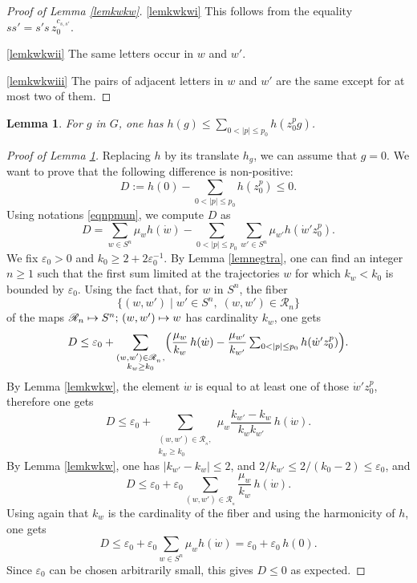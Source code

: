 \documentclass[JEP,XML,SOM,Unicode]{cedram}
\let\mathcal\mathscr
\def\mto{\mathchoice{\longmapsto}{\mapsto}{\mapsto}{\mapsto}}
\newtheorem{Lem}[Thm]{Lemma}
\theoremstyle{definition}
\newcommand{\mc}[1]{\mathcal{ #1}}
\let\eps\varepsilon
\begin{document}
\skpt
\begin{proof}[Proof of Lemma \ref{lemkwkw}]
\eqref{lemkwkwi} This follows from the equality $ss'=s's\, z_0^{c_{s,s'}}$.

\eqref{lemkwkwii} The same letters occur in $w$ and $w'$.

\eqref{lemkwkwiii} The pairs of adjacent letters in $w$ and $w'$ are the same except for at most two of them.
\end{proof}

\begin{Lem}
\label{lemhghgzp}
For $g$ in $G$, one has $h(g)\leq \sum_{0<|p|\leq p_0}h(z_0^pg)$.
\end{Lem}

\begin{proof}[Proof of Lemma \ref{lemhghgzp}]
Replacing $h$ by its translate $h_g$, we can assume that $g=0$.
We want to prove that the following difference is non-positive:
\[
D:=
h(0)- \sum_{0<|p|\leq p_0}h(z_0^p) \leq 0.
\]
Using notations \eqref{eqnpmun}, we compute $D$ as
\[
D=
\sum_{w\in S^n}\mu_wh(\dot{w})-
\sum_{0<|p|\leq p_0}\sum_{w'\in S^n}\mu_{w'}h(\dot{w}'z_0^p).
\]
We fix $\eps_0>0$ and $k_0\geq 2+2\eps_0^{-1}$.
By Lemma \ref{lemnegtra}, one can find an integer $n\geq 1$
such that
the first sum limited at the trajectories $w$ for which $k_w<k_0$ is bounded by $\eps_0$. Using the fact that, for $w$ in $S^n$, the fiber
\[
\{(w,w')\mid w'\in S^n,\; (w,w')\in \mc R_n\}
\]
of the maps
$\mc R_n\mto S^n;\,(w,w')\mto w$ has cardinality $k_w$, one gets
\[
D\leq
\eps_0+
\sum_{\substack{(w,w')\in \mc R_{_n},\\ k_w\geq k_0}}
\Bigl(\frac{\mu_w}{k_w}\,h(\dot{w})-
\frac{\mu_{w'}}{k_{w'}}
\textstyle\sum_{0<|p|\leq p_0}h(\dot{w}'z_0^p)\Bigr).
\]
By Lemma \ref{lemkwkw}, the element $\dot{w}$ is equal
to at least one of those $\dot{w}'z_0^p$, therefore one gets
\[
D\leq
\eps_0+
\sum_{\substack{(w,w')\in \mc R_{_n},\\ k_w\geq k_0}}
\mu_w\frac{k_{w'}-k_w}{k_wk_{w'}}\,h(\dot{w}).
\]
By Lemma \ref{lemkwkw}, one has $|k_{w'}\!-\!k_w|\leq 2$,
and $2/k_{w'}\leq 2/(k_0\!-\!2)\leq \eps_0$, and
\[
D\leq
\eps_0+
\eps_0
\sum_{(w,w')\in \mc R_{_n}}
\frac{\mu_w}{k_w}\,h(\dot{w}).
\]
Using again that $k_w$ is the cardinality of the fiber and using the harmonicity of $h$,
one gets
\[
D\leq
\eps_0+
\eps_0
\sum_{w\in S^n}
\mu_w h(\dot{w})
=
\eps_0+
\eps_0\, h(0).
\]
Since $\eps_0$ can be chosen arbitrarily small, this gives $D\leq 0$ as expected.
\end{proof}
\end{document}
